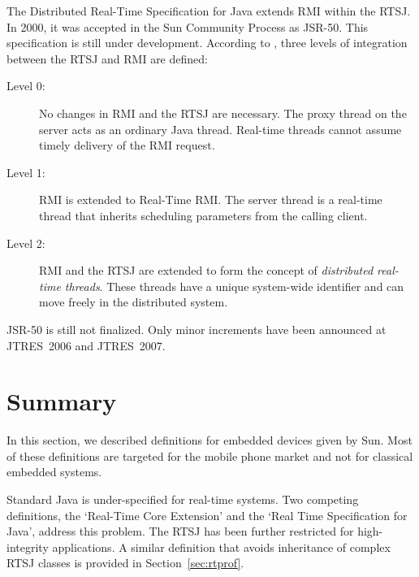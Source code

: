 The Distributed Real-Time Specification for Java \cite{Jensen00}
extends RMI within the RTSJ. In 2000, it was accepted in the Sun
Community Process as JSR-50. This specification is still under
development. According to \cite{WellRTSJRMI}, three levels of
integration between the RTSJ and RMI are defined:
%
\begin{description}
    \item[Level 0:] No changes in RMI and the RTSJ are necessary. The proxy thread
on the server acts as an ordinary Java thread. Real-time threads
cannot assume timely delivery of the RMI request.

    \item[Level 1:] RMI is extended to Real-Time RMI. The server
thread is a real-time thread that inherits scheduling parameters
from the calling client.

    \item[Level 2:] RMI and the RTSJ are extended to form the
concept of \textit{distributed real-time threads}. These threads
have a unique system-wide identifier and can move freely in the
distributed system.

\end{description}

JSR-50 is still not finalized. Only minor increments have been
announced at JTRES~2006 and JTRES~2007.

\section{Summary}

In this section, we described definitions for embedded devices given
by Sun. Most of these definitions are targeted for the mobile phone
market and not for classical embedded systems.

Standard Java is under-specified for real-time systems. Two
competing definitions, the `Real-Time Core Extension' and the `Real
Time Specification for Java', address this problem. The RTSJ has
been further restricted for high-integrity applications. A similar
definition that avoids inheritance of complex RTSJ classes is
provided in Section~\ref{sec:rtprof}.
